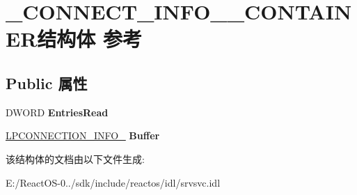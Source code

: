 \hypertarget{struct___c_o_n_n_e_c_t___i_n_f_o__1___c_o_n_t_a_i_n_e_r}{}\section{\+\_\+\+C\+O\+N\+N\+E\+C\+T\+\_\+\+I\+N\+F\+O\+\_\+\_\+\+C\+O\+N\+T\+A\+I\+N\+E\+R结构体 参考}
\label{struct___c_o_n_n_e_c_t___i_n_f_o__1___c_o_n_t_a_i_n_e_r}
\subsection*{Public 属性}
\begin{DoxyCompactItemize}
\item 
\mbox{\label{struct___c_o_n_n_e_c_t___i_n_f_o__1___c_o_n_t_a_i_n_e_r_a0aebf2f55301b305f9812d94496f8a2a}} 
D\+W\+O\+RD {\bfseries Entries\+Read}
\item 
\mbox{\label{struct___c_o_n_n_e_c_t___i_n_f_o__1___c_o_n_t_a_i_n_e_r_a7cc67e0a362620291fc5d3d9e6e1fc5d}} 
\hyperlink{struct___c_o_n_n_e_c_t_i_o_n___i_n_f_o__1}{L\+P\+C\+O\+N\+N\+E\+C\+T\+I\+O\+N\+\_\+\+I\+N\+F\+O\+\_} {\bfseries Buffer}
\end{DoxyCompactItemize}


该结构体的文档由以下文件生成\+:\begin{DoxyCompactItemize}
\item 
E\+:/\+React\+O\+S-\/0../sdk/include/reactos/idl/srvsvc.\+idl\end{DoxyCompactItemize}
